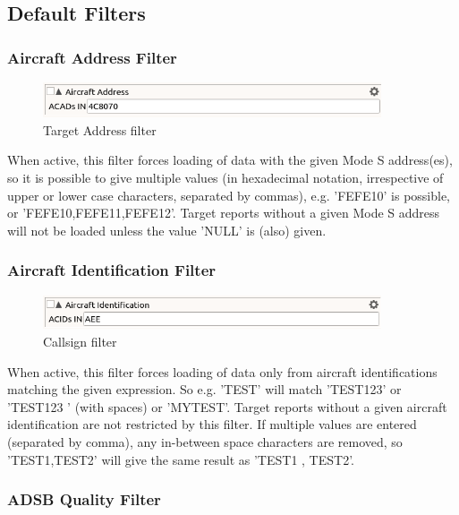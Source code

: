 \subsection{Default Filters}
\label{sec:default_filters}

\subsubsection{Aircraft Address Filter}

\begin{figure}[H]
  \center
    \includegraphics[width=10cm,frame]{figures/filter_acad.png}
  \caption{Target Address filter}
\end{figure}

When active, this filter forces loading of data with the given Mode S address(es), so it is possible to give multiple values (in hexadecimal notation, irrespective of upper or lower case characters, separated by commas), e.g. 'FEFE10' is possible, or 'FEFE10,FEFE11,FEFE12'.
Target reports without a given Mode S address will not be loaded unless the value 'NULL' is (also) given.

\subsubsection{Aircraft Identification Filter}

\begin{figure}[H]
  \center
    \includegraphics[width=10cm,frame]{figures/filter_acid.png}
  \caption{Callsign filter}
\end{figure}

When active, this filter forces loading of data only from aircraft identifications matching the given expression. So e.g. 'TEST' will match 'TEST123' or 'TEST123   ' (with spaces) or 'MYTEST'. Target reports without a given aircraft identification are not restricted by this filter. If multiple values are entered (separated by comma), any in-between space characters are removed, so 'TEST1,TEST2' will give the same result as 'TEST1 , TEST2'.

\subsubsection{ADSB Quality Filter}

